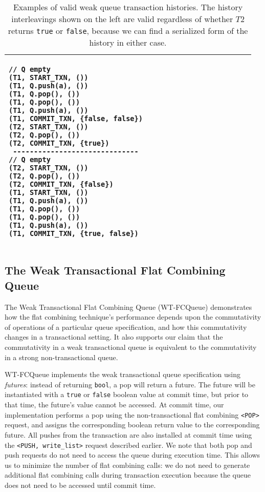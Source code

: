 \begin{table}[H]
\begin{tabular}{|l|l|}
\begin{lstlisting}
// Q empty
(T1, START_TXN, ())                       
(T1, Q.push(a), ())                       
(T1, Q.pop(), ())                       
(T1, Q.pop(), ())                       
(T1, Q.push(a), ())                       
(T1, COMMIT_TXN, {false, false})                       
(T2, START_TXN, ())                       
(T2, Q.pop(), ())                       
(T2, COMMIT_TXN, {true})                       
 ------------------------------
// Q empty
(T2, START_TXN, ())                       
(T2, Q.pop(), ())                       
(T2, COMMIT_TXN, {false})                       
(T1, START_TXN, ())                       
(T1, Q.push(a), ())                       
(T1, Q.pop(), ())                       
(T1, Q.pop(), ())                       
(T1, Q.push(a), ())                       
(T1, COMMIT_TXN, {true, false})                       
\end{lstlisting}\\
    \hline
    
    \end{tabular}
    \caption[Examples of valid weak queue transaction histories.]{Examples of valid weak queue transaction histories. The history interleavings shown on the left are valid regardless of whether $T2$ returns \texttt{true} or \texttt{false}, because we can find a serialized form of the history in either case.}
    \label{tab:txnal_weakq_commute}
    \end{table}

\subsection{The Weak Transactional Flat Combining Queue}
The Weak Transactional Flat Combining Queue (WT-FCQueue) demonstrates how the flat combining technique's performance depends upon the commutativity of operations of a particular queue specification, and how this commutativity changes in a transactional setting. It also supports our claim that the commutativity in a weak transactional queue is equivalent to the commutativity in a strong non-transactional queue.

WT-FCQueue implements the weak transactional queue specification using \emph{futures}: instead of returning \texttt{bool}, a pop will return a future. The future will be instantiated with a \texttt{true} or \texttt{false} boolean value at commit time, but prior to that time, the future's value cannot be accessed.
At commit time, our implementation performs a pop using the non-transactional flat combining \texttt{<POP>} request, and assigns the corresponding boolean return value to the corresponding future. All pushes from the transaction are also installed at commit time using the \texttt{<PUSH, write\_list>} request described earlier. We note that both pop and push requests do not need to access the queue during execution time. This allows us to minimize the number of flat combining calls: we do not need to generate additional flat combining calls during transaction execution because the queue does not need to be accessed until commit time.

